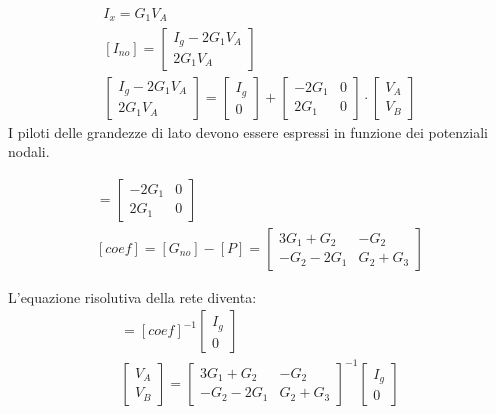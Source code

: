 \documentclass{article}
\numberwithin{equation}{subsection}
\begin{document}
\begin{gather*}
    I_x=G_1V_A\\
    [I_{no}]=\begin{bmatrix}
        I_g-2G_1V_A\\
        2G_1V_A
    \end{bmatrix}\\
    \begin{bmatrix}
        I_g-2G_1V_A\\
        2G_1V_A    
    \end{bmatrix}=
    \begin{bmatrix}
        I_g\\
        0
    \end{bmatrix}+\begin{bmatrix}
        -2G_1&0\\
        2G_1&0
    \end{bmatrix}\cdot\begin{bmatrix}
        V_A\\
        V_B
    \end{bmatrix}
\end{gather*}
I piloti delle grandezze di lato devono essere espressi in funzione dei potenziali nodali. 

\begin{gather*}
    [P]=\begin{bmatrix}
        -2G_1&0\\
        2G_1&0
    \end{bmatrix}\\
    [{coef}]=[G_{no}]-[P]=\begin{bmatrix}
        3G_1+G_2&-G_2\\
        -G_2-2G_1&G_2+G_3
    \end{bmatrix}
\end{gather*}

L'equazione risolutiva della rete diventa:
\begin{gather*}
    [V_{no}]=[coef]^{-1}\begin{bmatrix}
        I_g\\
        0
    \end{bmatrix}\\
    \begin{bmatrix}
        V_A\\
        V_B
    \end{bmatrix}=
    \begin{bmatrix}
        3G_1+G_2&-G_2\\
        -G_2-2G_1&G_2+G_3
    \end{bmatrix}^{-1}\begin{bmatrix}
        I_g\\
        0
    \end{bmatrix}
\end{gather*}
\end{document}
